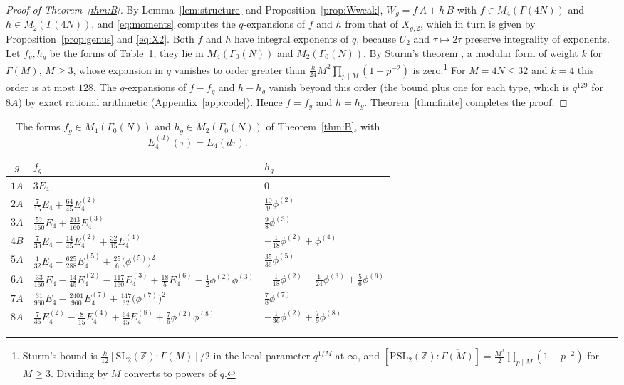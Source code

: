 \documentclass[11pt]{amsart}
\theoremstyle{definition}
\newcommand{\ZZ}{\mathbb{Z}}
\begin{document}
\begin{proof}[Proof of Theorem~\ref{thm:B}]
By Lemma~\ref{lem:structure} and Proposition~\ref{prop:Wweak}, $W_g=f\,A+h\,B$ with $f\in M_4(\Gamma(4N))$ and $h\in M_2(\Gamma(4N))$, and \eqref{eq:moments} computes the $q$-expansions of $f$ and $h$ from that of $X_{g,2}$, which in turn is given by Proposition~\ref{prop:genus} and \eqref{eq:X2}. Both $f$ and $h$ have integral exponents of $q$, because $U_2$ and $\tau\mapsto2\tau$ preserve integrality of exponents. Let $f_g,h_g$ be the forms of Table~\ref{tab:fh}; they lie in $M_4(\Gamma_0(N))$ and $M_2(\Gamma_0(N))$. By Sturm's theorem \cite{Stu87}, a modular form of weight $k$ for $\Gamma(M)$, $M\ge3$, whose expansion in $q$ vanishes to order greater than $\frac{k}{24}M^2\prod_{p\mid M}(1-p^{-2})$ is zero.\footnote{Sturm's bound is $\frac{k}{12}[\mathrm{SL}_2(\ZZ):\Gamma(M)]/2$ in the local parameter $q^{1/M}$ at $\infty$, and $[\mathrm{PSL}_2(\ZZ):\overline{\Gamma(M)}]=\frac{M^3}{2}\prod_{p\mid M}(1-p^{-2})$ for $M\ge3$. Dividing by $M$ converts to powers of $q$.} For $M=4N\le 32$ and $k=4$ this order is at most $128$. The $q$-expansions of $f-f_g$ and $h-h_g$ vanish beyond this order (the bound plus one for each type, which is $q^{129}$ for $8A$) by exact rational arithmetic (Appendix~\ref{app:code}). Hence $f=f_g$ and $h=h_g$. Theorem~\ref{thm:finite} completes the proof.
\end{proof}

\begin{table}[H]
\centering
\caption{The forms $f_g\in M_4(\Gamma_0(N))$ and $h_g\in M_2(\Gamma_0(N))$ of Theorem~\ref{thm:B}, with $E_4^{(d)}(\tau)=E_4(d\tau)$.}
\label{tab:fh}
\renewcommand{\arraystretch}{1.3}
\begin{tabular}{cll}
\toprule
$g$ & $f_g$ & $h_g$\\
\midrule
$1A$ & $3E_4$ & $0$\\
$2A$ & $\tfrac7{15}E_4+\tfrac{64}{45}E_4^{(2)}$ & $\tfrac{10}9\phi^{(2)}$\\
$3A$ & $\tfrac{57}{160}E_4+\tfrac{243}{160}E_4^{(3)}$ & $\tfrac98\phi^{(3)}$\\
$4B$ & $\tfrac7{30}E_4-\tfrac{14}{45}E_4^{(2)}+\tfrac{32}{15}E_4^{(4)}$ & $-\tfrac1{18}\phi^{(2)}+\phi^{(4)}$\\
$5A$ & $\tfrac1{32}E_4-\tfrac{625}{288}E_4^{(5)}+\tfrac{25}6\bigl(\phi^{(5)}\bigr)^2$ & $\tfrac{35}{36}\phi^{(5)}$\\
$6A$ & $\tfrac{33}{160}E_4-\tfrac{14}{45}E_4^{(2)}-\tfrac{117}{160}E_4^{(3)}+\tfrac{18}5E_4^{(6)}-\tfrac12\phi^{(2)}\phi^{(3)}$ & $-\tfrac1{18}\phi^{(2)}-\tfrac1{24}\phi^{(3)}+\tfrac56\phi^{(6)}$\\
$7A$ & $\tfrac{31}{960}E_4-\tfrac{2401}{960}E_4^{(7)}+\tfrac{147}{32}\bigl(\phi^{(7)}\bigr)^2$ & $\tfrac78\phi^{(7)}$\\
$8A$ & $\tfrac7{36}E_4^{(2)}-\tfrac8{15}E_4^{(4)}+\tfrac{64}{45}E_4^{(8)}+\tfrac76\phi^{(2)}\phi^{(8)}$ & $-\tfrac1{36}\phi^{(2)}+\tfrac79\phi^{(8)}$\\
\bottomrule
\end{tabular}
\end{table}
\end{document}
